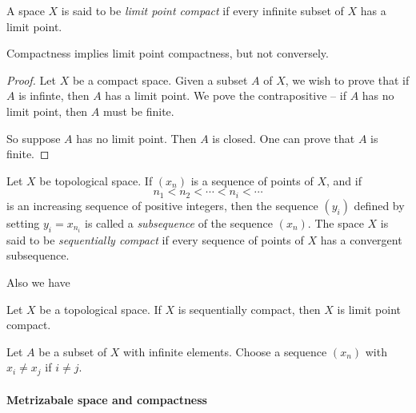 \begin{definition}
  A space \( X \) is said to be \emph{limit point compact} if every infinite subset of \( X \) has a limit point.
\end{definition}

\begin{theorem}
  Compactness implies limit point compactness, but not conversely.
\end{theorem}
\begin{proof}
  Let \( X \) be a compact space.
  Given a subset \( A \) of \( X \), we wish to prove that if \( A \) is infinte, then \( A \) has a limit point.
  We pove the contrapositive -- if \( A \) has no limit point, then \( A \) must be finite.

  So suppose \( A \) has no limit point.
  Then \( A \) is closed.
  One can prove that \( A \) is finite.
\end{proof}

\begin{definition}
  Let \( X \) be topological space.
  If \( (x_n) \) is a sequence of points of \( X \), and if
  \[
    n_1 < n_2 < \cdots < n_i < \cdots
  \]
  is an increasing sequence of positive integers, then the sequence \( (y_i) \) defined by setting \( y_i = x_{n_i} \) is called a \emph{subsequence} of the sequence \( (x_n) \).
  The space \( X \) is said to be \emph{sequentially compact} if every sequence of points of \( X \) has a convergent subsequence.
\end{definition}

\noindent Also we have

\begin{theorem}
  Let \( X \) be a topological space.
  If \( X \) is sequentially compact, then \( X \) is limit point compact.
\end{theorem}
\begin{sketchproof}
  Let \( A \) be a subset of \( X \) with infinite elements.
  Choose a sequence \( (x_n) \) with \( x_i \neq x_j \) if \( i \neq j \).
\end{sketchproof}


\paragraph{Metrizabale space and compactness}


